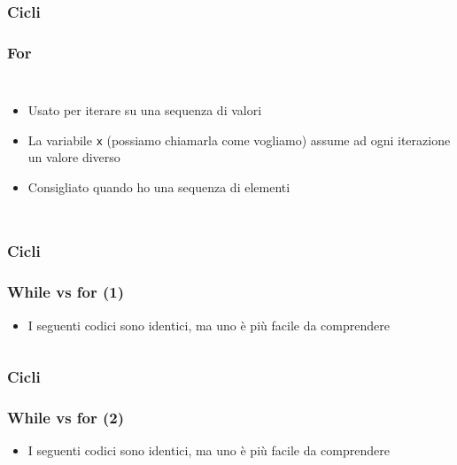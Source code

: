 \begin{contentframe}
    \frametitle{Cicli}
    \frametitle{For}

    \begin{columns}
        \begin{itemize}
            \item Usato per iterare su una sequenza di valori
            \item La variabile \texttt{x} (possiamo chiamarla come vogliamo) assume ad ogni iterazione un valore diverso

            \bigskip
            \item Consigliato quando ho una sequenza di elementi
        \end{itemize}
        
        \centering
    \end{columns}
\end{contentframe}

\begin{contentframe}
    \frametitle{Cicli}
    \frametitle{While vs for (1)}

    \begin{itemize}
        \item I seguenti codici sono identici, ma uno è più facile da comprendere
    \end{itemize}

    \begin{columns}
        \centering
        
        \centering
    \end{columns}
\end{contentframe}

\begin{contentframe}
    \frametitle{Cicli}
    \frametitle{While vs for (2)}

    \begin{itemize}
        \item I seguenti codici sono identici, ma uno è più facile da comprendere
    \end{itemize}

    \begin{columns}
        \centering
        
        \centering
    \end{columns}
\end{contentframe}

